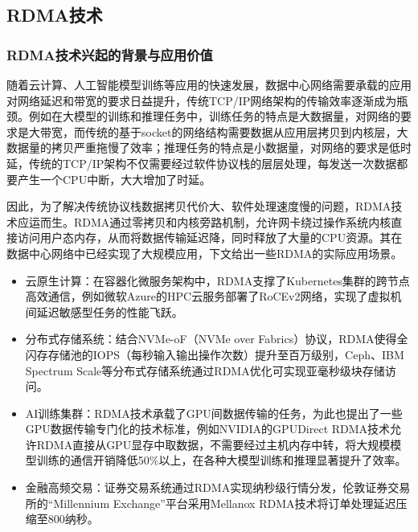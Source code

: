 \documentclass{seuthesis-2022}
\begin{document}
\subsection{RDMA技术}
\subsubsection{RDMA技术兴起的背景与应用价值}
随着云计算、人工智能模型训练等应用的快速发展，数据中心网络需要承载的应用对网络延迟和带宽的要求日益提升，传统TCP/IP网络架构的传输效率逐渐成为瓶颈。例如在大模型的训练和推理任务中，训练任务的特点是大数据量，对网络的要求是大带宽，而传统的基于socket的网络结构需要数据从应用层拷贝到内核层，大数据量的拷贝严重拖慢了效率；推理任务的特点是小数据量，对网络的要求是低时延，传统的TCP/IP架构不仅需要经过软件协议栈的层层处理，每发送一次数据都要产生一个CPU中断，大大增加了时延。

因此，为了解决传统协议栈数据拷贝代价大、软件处理速度慢的问题，RDMA技术应运而生。RDMA通过​​零拷贝​和​​内核旁路​​机制，允许网卡绕过操作系统内核直接访问用户态内存，从而将数据传输延迟降，同时释放了大量的CPU资源。其在数据中心网络中已经实现了大规模应用，下文给出一些RDMA的实际应用场景。

\begin{itemize}
    \item ​​云原生计算​​：在容器化微服务架构中，RDMA支撑了Kubernetes集群的跨节点高效通信，例如微软Azure的HPC云服务部署了RoCEv2网络，实现了虚拟机间延迟敏感型任务的性能飞跃。
    \item ​​分布式存储系统​​：结合NVMe-oF（NVMe over Fabrics）协议，RDMA使得全闪存存储池的IOPS（每秒输入输出操作次数）提升至百万级别，Ceph、IBM Spectrum Scale等分布式存储系统通过RDMA优化可实现亚毫秒级块存储访问。
    \item ​​AI训练集群​​：RDMA技术承载了GPU间数据传输的任务，为此也提出了一些GPU数据传输专门化的技术标准，例如NVIDIA的GPUDirect RDMA技术允许RDMA直接从GPU显存中取数据，不需要经过主机内存中转，将大规模模型训练的通信开销降低50\%以上，在各种大模型训练和推理显著提升了效率。
    \item ​​金融高频交易​​：证券交易系统通过RDMA实现纳秒级行情分发，伦敦证券交易所的“Millennium Exchange”平台采用Mellanox RDMA技术将订单处理延迟压缩至800纳秒。
\end{itemize}
\end{document}
